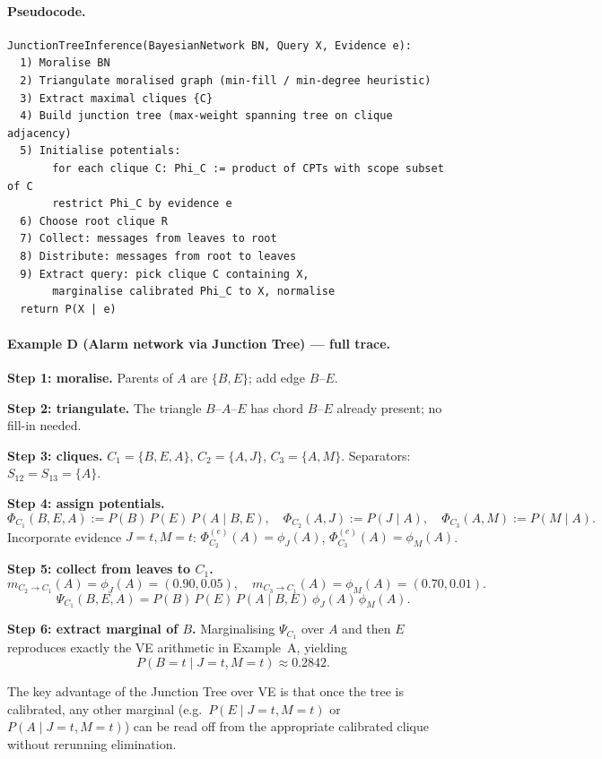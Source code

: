 \paragraph{Pseudocode.}
\vspace*{3mm}
\begin{algorithmbox}
\begin{verbatim}
JunctionTreeInference(BayesianNetwork BN, Query X, Evidence e):
  1) Moralise BN
  2) Triangulate moralised graph (min-fill / min-degree heuristic)
  3) Extract maximal cliques {C}
  4) Build junction tree (max-weight spanning tree on clique adjacency)
  5) Initialise potentials:
       for each clique C: Phi_C := product of CPTs with scope subset of C
       restrict Phi_C by evidence e
  6) Choose root clique R
  7) Collect: messages from leaves to root
  8) Distribute: messages from root to leaves
  9) Extract query: pick clique C containing X,
       marginalise calibrated Phi_C to X, normalise
  return P(X | e)
\end{verbatim}
\end{algorithmbox}

\vspace*{3mm}
\begin{examplebox}
\paragraph{Example D (Alarm network via Junction Tree) --- full trace.}

\textbf{Step 1: moralise.} Parents of $A$ are $\{B,E\}$; add edge $B$--$E$.

\textbf{Step 2: triangulate.} The triangle $B$--$A$--$E$ has chord $B$--$E$
already present; no fill-in needed.

\textbf{Step 3: cliques.}
$C_1=\{B,E,A\}$, $C_2=\{A,J\}$, $C_3=\{A,M\}$.
Separators: $S_{12}=S_{13}=\{A\}$.

\textbf{Step 4: assign potentials.}
\[
\Phi_{C_1}(B,E,A):=P(B)\,P(E)\,P(A\mid B,E),\quad
\Phi_{C_2}(A,J):=P(J\mid A),\quad
\Phi_{C_3}(A,M):=P(M\mid A).
\]
Incorporate evidence $J=t,M=t$:
$\Phi_{C_2}^{(e)}(A)=\phi_J(A)$, $\Phi_{C_3}^{(e)}(A)=\phi_M(A)$.

\textbf{Step 5: collect from leaves to $C_1$.}
\[
m_{C_2\to C_1}(A)=\phi_J(A)=(0.90,0.05),\quad
m_{C_3\to C_1}(A)=\phi_M(A)=(0.70,0.01).
\]
\[
\Psi_{C_1}(B,E,A)
=P(B)\,P(E)\,P(A\mid B,E)\,\phi_J(A)\,\phi_M(A).
\]

\textbf{Step 6: extract marginal of $B$.}
Marginalising $\Psi_{C_1}$ over $A$ and then $E$ reproduces exactly the VE
arithmetic in Example~A, yielding
\[
P(B=t\mid J=t,M=t)\approx\mathbf{0.2842}.
\]

The key advantage of the Junction Tree over VE is that once the tree is
calibrated, any other marginal (e.g.\ $P(E\mid J=t,M=t)$ or
$P(A\mid J=t,M=t)$) can be read off from the appropriate calibrated clique
without rerunning elimination.
\end{examplebox}

